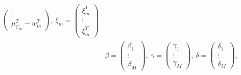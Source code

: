 \documentclass{jsarticle}
\begin{document}
\begin{align*}
\begin{pmatrix}
	\vdots\\
	\mu_{C_m}^T - w_m^T\end{pmatrix},\ \xi_m = \begin{pmatrix} \xi_m^1\\
	\vdots\\
	\xi_m^T \end{pmatrix}\\[8pt]
	&\beta = \begin{pmatrix}\beta_1\\
	\vdots\\
	\beta_M\end{pmatrix},\ \gamma = \begin{pmatrix}\gamma_1\\
	\vdots\\
	\gamma_M\end{pmatrix},\ \delta = \begin{pmatrix}\delta_1\\
	\vdots\\
	\delta_M\end{pmatrix},\
\end{align*}
\end{document}
